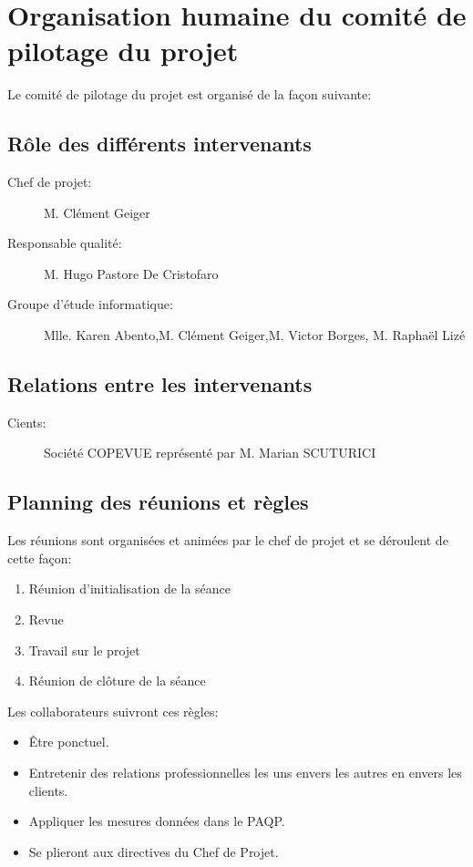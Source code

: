 
\section{Organisation humaine du comité de pilotage du projet}

Le comité de pilotage du projet est organisé de la façon suivante:

    \subsection{Rôle des différents intervenants}
\begin{description}
\item[Chef de projet:]M. Clément Geiger
\item[Responsable qualité:]M. Hugo Pastore De Cristofaro
\item[Groupe d'étude informatique:]Mlle. Karen Abento,M. Clément Geiger,M. 
Victor Borges, M. Raphaël Lizé
\end{description}

    \subsection{Relations entre les intervenants}
\begin{description}
\item[Cients:]Société COPEVUE représenté par M. Marian SCUTURICI
\end{description}

    \subsection{Planning des réunions et règles}
Les réunions sont organisées et animées par le chef de projet et se
déroulent de cette façon:
\begin{enumerate}
\item Réunion d'initialisation de la séance
\item Revue
\item Travail sur le projet
\item Réunion de clôture de la séance
\end{enumerate}

Les collaborateurs suivront ces règles:
\begin{itemize}
\item Être ponctuel.
\item Entretenir des relations professionnelles les uns envers les
        autres en envers les clients.
\item Appliquer les mesures données dans le PAQP.
\item Se plieront aux directives du Chef de Projet.
\end{itemize}
